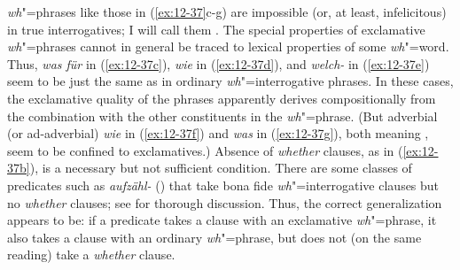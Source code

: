\documentclass[output=paper]{langsci/langscibook}
\begin{document}
\emph{wh}"=phrases like those in (\ref{ex:12-37}c-g) are impossible (or, at
least, infelicitous) in true interrogatives; I will call them
. The special properties of exclamative
\emph{wh}"=phrases cannot in general be traced to lexical properties of
some \emph{wh}"=word. Thus, \textit{was für} in (\ref{ex:12-37c}), \textit{wie} in
(\ref{ex:12-37d}), and \textit{welch-} in (\ref{ex:12-37e}) seem to be just the same as in
ordinary \emph{wh}"=interrogative phrases. In these cases, the
exclamative quality of the phrases apparently derives compositionally
from the combination with the other constituents in the \emph{wh}"=phrase. (But adverbial (or ad-adverbial)  \textit{wie} in (\ref{ex:12-37f}) and \textit{was} in (\ref{ex:12-37g}), both meaning , seem to be confined to
exclamatives.)  Absence of \textit{whether} clauses, as in (\ref{ex:12-37b}), is a
necessary but not sufficient condition. There are some classes of
predicates such as \textit{aufzähl-} () that take bona fide \emph{wh}"=interrogative clauses but no  \textit{whether} clauses; see \citet{Schwarz1994}
for thorough discussion. Thus, the correct generalization appears to
be: if a predicate takes a clause with an exclamative \emph{wh}"=phrase,
it also takes a clause with an ordinary \emph{wh}"=phrase, but does not
(on the same reading) take a \textit{whether} clause.
\end{document}
